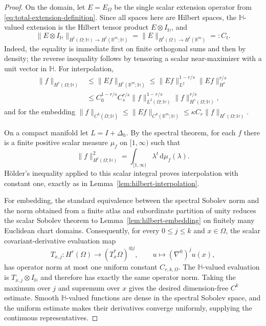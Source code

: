 \documentclass[11pt]{article}
\theoremstyle{definition}
\theoremstyle{remark}
\newcommand{\R}{\mathbb{R}}
\newcommand{\dd}{\mathrm{d}}
\begin{document}
\begin{proof}
On the domain, let $E=E_\Omega$ be the single scalar extension operator from
\eqref{eq:total-extension-definition}. Since all spaces here are Hilbert
spaces, the $\mathbb H$-valued extension is the Hilbert tensor product
$E\otimes I_{\mathbb H}$, and
\begin{equation}
  \|E\otimes I_{\mathbb H}\|_{H^t(\Omega;\mathbb H)\to
  H^t(\R^m;\mathbb H)}=\|E\|_{H^t(\Omega)\to H^t(\R^m)}=:C_t.
\end{equation}
Indeed, the equality is immediate first on finite orthogonal sums and then by
density; the reverse inequality follows by tensoring a scalar near-maximizer
with a unit vector in $\mathbb H$. For interpolation,
\begin{equation}
\begin{split}
    \|f\|_{H^r(\Omega;\mathbb H)}
    &\le\|Ef\|_{H^r(\R^m;\mathbb H)}
     \le\|Ef\|_{L^2}^{1-r/s}\|Ef\|_{H^s}^{r/s}\\
    &\le C_0^{1-r/s}C_s^{r/s}
      \|f\|_{L^2(\Omega;\mathbb H)}^{1-r/s}
      \|f\|_{H^s(\Omega;\mathbb H)}^{r/s},
\end{split}
\end{equation}
and for the embedding
$\|f\|_{C^k(\overline\Omega;\mathbb H)}\le\|Ef\|_{C^k(\R^m;\mathbb H)}
\le\kappa C_r\|f\|_{H^r(\Omega;\mathbb H)}$.

On a compact manifold let $L=I+\Delta_h$. By the spectral theorem, for each
$f$ there is a finite positive scalar measure $\mu_f$ on $[1,\infty)$ such that
\begin{equation}
  \|f\|_{H^t(\Omega;\mathbb H)}^2
  =\int_{[1,\infty)}\lambda^t\,\dd\mu_f(\lambda).
\end{equation}
H\"older's inequality applied to this scalar integral proves interpolation with
constant one, exactly as in Lemma~\ref{lem:hilbert-interpolation}.

For embedding, the standard equivalence between the spectral Sobolev norm and
the norm obtained from a finite atlas and subordinate partition of unity
\citep{hebey1996} reduces the scalar Sobolev theorem to
Lemma~\ref{lem:hilbert-embedding} on finitely many Euclidean chart domains.
Consequently, for every $0\le j\le k$ and $x\in\Omega$,
the scalar covariant-derivative evaluation map
\begin{equation}
  T_{x,j}:H^r(\Omega)\longrightarrow (T_x^*\Omega)^{\otimes j},
  \qquad u\longmapsto(\nabla^0)^ju(x),
\end{equation}
has operator norm at most one uniform constant $C_{r,k,\Omega}$. The
$\mathbb H$-valued evaluation is $T_{x,j}\otimes I_{\mathbb H}$ and therefore
has exactly the same operator norm. Taking the maximum over $j$ and supremum
over $x$ gives the desired dimension-free $C^k$ estimate. Smooth
$\mathbb H$-valued functions are dense in the spectral Sobolev space, and the
uniform estimate makes their derivatives converge uniformly, supplying the
continuous representatives.
\end{proof}
\end{document}
